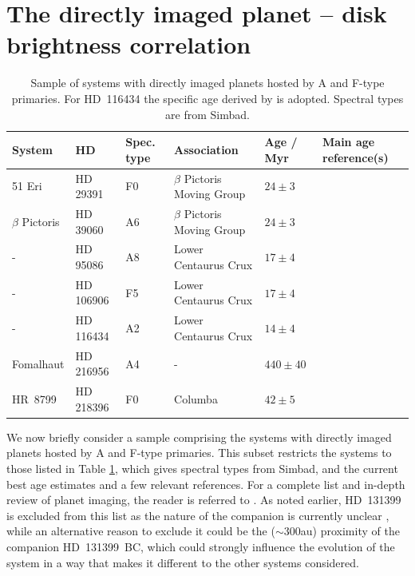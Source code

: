 \documentclass[a4paper,fleqn,usenatbib]{mnras}
\begin{document}
\section{The directly imaged planet -- disk brightness
  correlation}\label{s:corr}

\begin{table}
  \caption{Sample of systems with directly imaged planets hosted by A
    and F-type primaries. For HD~116434 the specific age derived by
    \citet{2017arXiv170701413C} is adopted. Spectral types are from Simbad.}\label{tab:pl}
  \begin{tabular}{llllll}
    \hline
    System & HD & Spec. type & Association & Age / Myr & Main age reference(s) \\
    \hline
    51 Eri & HD 29391 & F0 & $\beta$ Pictoris Moving Group & $24 \pm 3$ & \citet{2001ApJ...562L..87Z,2014MNRAS.445.2169M,2015MNRAS.454..593B} \\
    $\beta$ Pictoris & HD 39060 & A6 & $\beta$ Pictoris Moving Group & $24 \pm 3$ & \citet{2001ApJ...562L..87Z,2014MNRAS.445.2169M,2015MNRAS.454..593B} \\
    - & HD 95086 & A8 & Lower Centaurus Crux & $17 \pm 4$ & \citet{2013ApJ...775L..40M} \\
    - & HD 106906 & F5 & Lower Centaurus Crux & $17 \pm 4$ & \citet{2013ApJ...775L..40M} \\
    - & HD 116434 & A2 & Lower Centaurus Crux & $14 \pm 4$ & \citet{2017arXiv170701413C} \\
    Fomalhaut & HD 216956 & A4 & - & $440 \pm 40$ & \citet{1997ApJ...475..313B,2012ApJ...754L..20M} \\
    HR~8799 & HD 218396 & F0 & Columba & $42 \pm 5$ & \citet{2008hsf2.book..757T,2011ApJ...732...61Z,2015MNRAS.454..593B} \\
    \hline
  \end{tabular}
\end{table}

We now briefly consider a sample comprising the systems with directly
imaged planets hosted by A and F-type primaries. This subset restricts
the systems to those listed in Table \ref{tab:pl}, which gives spectral
types from Simbad, and the current best age estimates and a few relevant
references. For a complete list and in-depth review of planet imaging,
the reader is referred to \citet{2016PASP..128j2001B}. As noted earlier,
HD~131399 is excluded from this list as the nature of the companion is
currently unclear \citep{2016Sci...353..673W,2017arXiv170506851N}, while
an alternative reason to exclude it could be the ($\sim$300au) proximity
of the companion HD~131399~BC, which could strongly influence the
evolution of the system in a way that makes it different to the other
systems considered.
\end{document}
